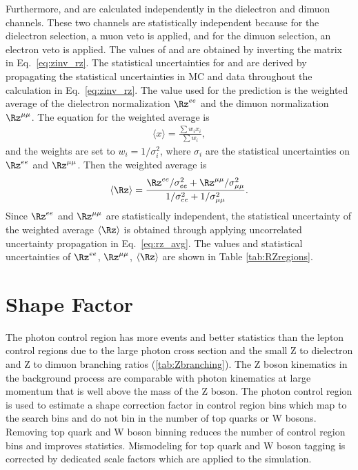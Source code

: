 Furthermore, \Rz and \Rt are calculated independently in the dielectron and dimuon channels.
These two channels are statistically independent because for the dielectron selection, a muon veto is applied, and for the dimuon selection, an electron veto is applied.
The values of \Rz and \Rt are obtained by inverting the matrix in Eq.~\ref{eq:zinv_rz}.
The statistical uncertainties for \Rz and \Rt are derived by propagating the statistical uncertainties in MC and data throughout the calculation in Eq.~\ref{eq:zinv_rz}.
The \Rz value used for the \zinv prediction is the weighted average of the dielectron normalization $\Rz^{ee}$ and the dimuon normalization $\Rz^{\mu\mu}$.
The equation for the weighted average is
\begin{align}
\label{eq:weighted_avg}
\langle x \rangle = \frac{\sum w_i x_i}{\sum w_i},
\end{align}
and the weights are set to $w_i = 1/\sigma_i^2$, where $\sigma_i$ are the statistical uncertainties on $\Rz^{ee}$ and $\Rz^{\mu\mu}$.
Then the \Rz weighted average is
\begin{align}
\label{eq:rz_avg}
\langle \Rz \rangle = \frac{\Rz^{ee}/\sigma_{ee}^2 + \Rz^{\mu\mu}/\sigma_{\mu\mu}^2}{1/\sigma_{ee}^2 + 1/\sigma_{\mu\mu}^2}.
\end{align}
Since $\Rz^{ee}$ and $\Rz^{\mu\mu}$ are statistically independent, the statistical uncertainty of the weighted average $\langle \Rz \rangle$ is obtained through applying uncorrelated uncertainty propagation in Eq.~\ref{eq:rz_avg}. The values and statistical uncertainties of $\Rz^{ee}$, $\Rz^{\mu\mu}$, $\langle \Rz \rangle$ are shown in Table \ref{tab:RZregions}.



\section{Shape Factor}
\label{sec:zinvisible-shape}

The photon control region has more events and better statistics than the lepton control regions due to the large photon cross section and the small Z to dielectron and Z to dimuon branching ratios (\cref{tab:Zbranching}).
The Z boson kinematics in the \zinv background process are comparable with photon kinematics at large momentum that is well above the mass of the Z boson.
The photon control region is used to estimate a shape correction factor in control region bins which map to the search bins and do not bin in the number of top quarks or W bosons.
Removing top quark and W boson binning reduces the number of control region bins and improves statistics.
Mismodeling for top quark and W boson tagging is corrected by dedicated scale factors which are applied to the \znunu simulation.

